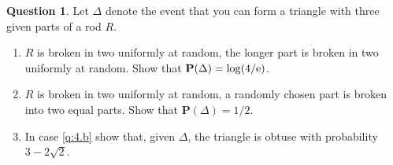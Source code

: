 \documentclass[utf8]{article}
\theoremstyle{definition}%
\newtheorem{question}{Question} %
\theoremstyle{plain}%
\begin{document}
\begin{question}
    Let $\Delta$ denote the event that you can form a triangle with three given parts of a rod $R$.
    \begin{enumerate}[label=(\alph*)]
        \item $R$ is broken in two uniformly at random, the longer part is broken in two uniformly at random. Show that $\mathbf{P}(\Delta) = \log(4/\mathrm{e})$.
        \item \label{q:4.b} $R$ is broken in two uniformly at random, a randomly chosen part is broken into two equal parts. Show that $\mathbf{P}(\Delta) = 1/2$.
        \item In case \ref{q:4.b} show that, given $\Delta$, the triangle is obtuse with probability $3 - 2\sqrt{2}$.
    \end{enumerate}
\end{question}
\end{document}
